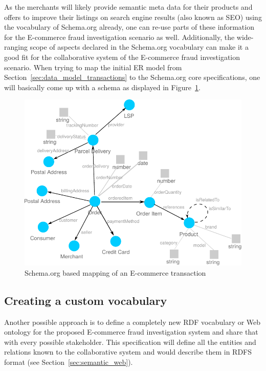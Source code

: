As the merchants will likely provide semantic meta data for their products and offers to improve their listings on search engine results (also known as \gls{SEO}) using the vocabulary of Schema.org already, one can re-use parts of these information for the \gls{E-commerce} fraud investigation scenario as well. Additionally, the wide-ranging scope of aspects declared in the Schema.org vocabulary can make it a good fit for the collaborative system of the \gls{E-commerce} fraud investigation scenario. When trying to map the initial \gls{ER} model from Section~\ref{sec:data_model_transactions} to the Schema.org core specifications, one will basically come up with a schema as displayed in Figure~\ref{fig:images_schema_org}. \@

\begin{figure}[H]
	\centering
		\includegraphics[width=0.8\columnwidth]{images/schema_org_mapping.pdf}
	\caption{Schema.org based mapping of an \gls{E-commerce} transaction}
\label{fig:images_schema_org}
\end{figure}


\subsection{Creating a custom vocabulary}
\label{subsec:build_ontology_frauds}

Another possible approach is to define a completely new \gls{RDF} vocabulary or Web ontology for the proposed \gls{E-commerce} fraud investigation system and share that with every possible stakeholder. This specification will define all the entities and relations known to the collaborative system and would describe them in \gls{RDFS} format (see Section~\ref{sec:semantic_web}). \\

